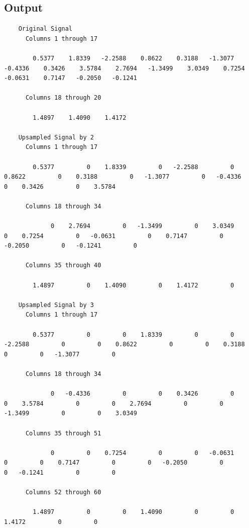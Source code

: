 \documentclass[a4paper,12pt]{article}
\begin{document}
\subsection*{Output}
\begin{lstlisting}
    Original Signal
      Columns 1 through 17

        0.5377    1.8339   -2.2588    0.8622    0.3188   -1.3077   -0.4336    0.3426    3.5784    2.7694   -1.3499    3.0349    0.7254   -0.0631    0.7147   -0.2050   -0.1241

      Columns 18 through 20

        1.4897    1.4090    1.4172

    Upsampled Signal by 2
      Columns 1 through 17

        0.5377         0    1.8339         0   -2.2588         0    0.8622         0    0.3188         0   -1.3077         0   -0.4336         0    0.3426         0    3.5784

      Columns 18 through 34

             0    2.7694         0   -1.3499         0    3.0349         0    0.7254         0   -0.0631         0    0.7147         0   -0.2050         0   -0.1241         0

      Columns 35 through 40

        1.4897         0    1.4090         0    1.4172         0

    Upsampled Signal by 3
      Columns 1 through 17

        0.5377         0         0    1.8339         0         0   -2.2588         0         0    0.8622         0         0    0.3188         0         0   -1.3077         0

      Columns 18 through 34

             0   -0.4336         0         0    0.3426         0         0    3.5784         0         0    2.7694         0         0   -1.3499         0         0    3.0349

      Columns 35 through 51

             0         0    0.7254         0         0   -0.0631         0         0    0.7147         0         0   -0.2050         0         0   -0.1241         0         0

      Columns 52 through 60

        1.4897         0         0    1.4090         0         0    1.4172         0         0

\end{lstlisting}
\end{document}
